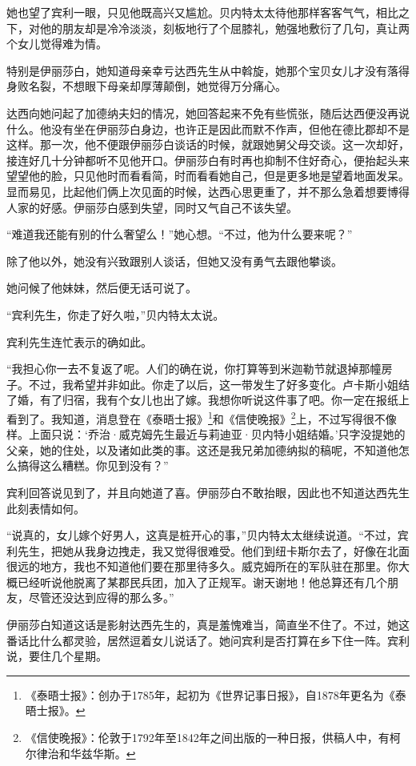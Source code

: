 \par 她也望了宾利一眼，只见他既高兴又尴尬。贝内特太太待他那样客客气气，相比之下，对他的朋友却是冷冷淡淡，刻板地行了个屈膝礼，勉强地敷衍了几句，真让两个女儿觉得难为情。
\par 特别是伊丽莎白，她知道母亲幸亏达西先生从中斡旋，她那个宝贝女儿才没有落得身败名裂，不想眼下母亲却厚薄颠倒，她觉得万分痛心。
\par 达西向她问起了加德纳夫妇的情况，她回答起来不免有些慌张，随后达西便没再说什么。他没有坐在伊丽莎白身边，也许正是因此而默不作声，但他在德比郡却不是这样。那一次，他不便跟伊丽莎白谈话的时候，就跟她舅父母交谈。这一次却好，接连好几十分钟都听不见他开口。伊丽莎白有时再也抑制不住好奇心，便抬起头来望望他的脸，只见他时而看看简，时而看看她自己，但是更多地是望着地面发呆。显而易见，比起他们俩上次见面的时候，达西心思更重了，并不那么急着想要博得人家的好感。伊丽莎白感到失望，同时又气自己不该失望。
\par “难道我还能有别的什么奢望么！”她心想。“不过，他为什么要来呢？”
\par 除了他以外，她没有兴致跟别人谈话，但她又没有勇气去跟他攀谈。
\par 她问候了他妹妹，然后便无话可说了。
\par “宾利先生，你走了好久啦，”贝内特太太说。
\par 宾利先生连忙表示的确如此。
\par “我担心你一去不复返了呢。人们的确在说，你打算等到米迦勒节就退掉那幢房子。不过，我希望并非如此。你走了以后，这一带发生了好多变化。卢卡斯小姐结了婚，有了归宿，我有个女儿也出了嫁。我想你听说这件事了吧。你一定在报纸上看到了。我知道，消息登在《泰晤士报》\footnote{《泰晤士报》：创办于1785年，起初为《世界记事日报》，自1878年更名为《泰晤士报》。}和《信使晚报》\footnote{《信使晚报》：伦敦于1792年至1842年之间出版的一种日报，供稿人中，有柯尔律治和华兹华斯。}上，不过写得很不像样。上面只说：‘乔治·威克姆先生最近与莉迪亚·贝内特小姐结婚。’只字没提她的父亲，她的住处，以及诸如此类的事。这还是我兄弟加德纳拟的稿呢，不知道他怎么搞得这么糟糕。你见到没有？”
\par 宾利回答说见到了，并且向她道了喜。伊丽莎白不敢抬眼，因此也不知道达西先生此刻表情如何。
\par “说真的，女儿嫁个好男人，这真是桩开心的事，”贝内特太太继续说道。“不过，宾利先生，把她从我身边拽走，我又觉得很难受。他们到纽卡斯尔去了，好像在北面很远的地方，我也不知道他们要在那里待多久。威克姆所在的军队驻在那里。你大概已经听说他脱离了某郡民兵团，加入了正规军。谢天谢地！他总算还有几个朋友，尽管还没达到应得的那么多。”
\par 伊丽莎白知道这话是影射达西先生的，真是羞愧难当，简直坐不住了。不过，她这番话比什么都灵验，居然逗着女儿说话了。她问宾利是否打算在乡下住一阵。宾利说，要住几个星期。
